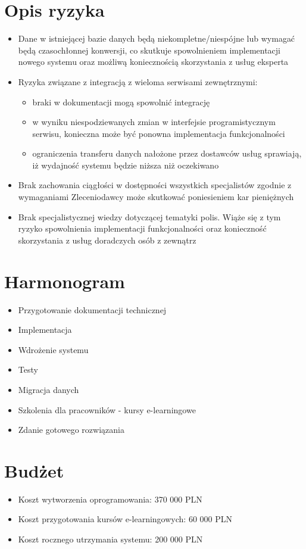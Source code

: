 \documentclass{article}
\begin{document}
\section{Opis ryzyka}
\begin{itemize}
	\item Dane w istniejącej bazie danych będą niekompletne/niespójne lub wymagać będą czasochłonnej konwersji, co skutkuje spowolnieniem implementacji nowego systemu oraz możliwą koniecznością skorzystania z usług eksperta
	\item Ryzyka związane z integracją z wieloma serwisami zewnętrznymi:
	\begin{itemize}
		\item braki w dokumentacji mogą spowolnić integrację
		\item w wyniku niespodziewanych zmian w interfejsie programistycznym serwisu, konieczna może być ponowna implementacja funkcjonalności
		\item ograniczenia transferu danych nałożone przez dostawców usług sprawiają, iż wydajność systemu będzie niższa niż oczekiwano
	\end{itemize}
	\item Brak zachowania ciągłości w dostępności wszystkich specjalistów zgodnie z wymaganiami Zleceniodawcy może skutkować poniesieniem kar pieniężnych
	\item Brak specjalistycznej wiedzy dotyczącej tematyki polis. Wiąże się z tym ryzyko spowolnienia implementacji funkcjonalności oraz konieczność skorzystania z usług doradczych osób z zewnątrz	
\end{itemize}

\section{Harmonogram}
\begin{itemize}
	\item Przygotowanie dokumentacji technicznej
	\item Implementacja
	\item Wdrożenie systemu
	\item Testy
	\item Migracja danych
	\item Szkolenia dla pracowników - kursy e-learningowe
	\item Zdanie gotowego rozwiązania	
\end{itemize}

\section{Budżet}
\begin{itemize}
	\item Koszt wytworzenia oprogramowania: 370 000 PLN
	\item Koszt przygotowania kursów e-learningowych: 60 000 PLN
	\item Koszt rocznego utrzymania systemu: 200 000 PLN
\end{itemize}
\end{document}
